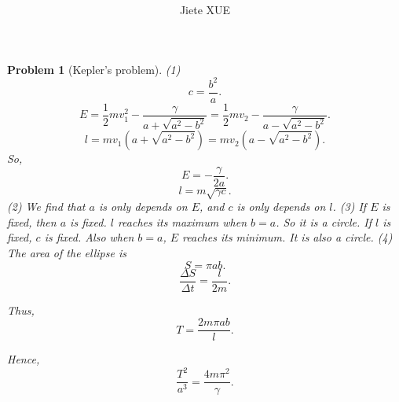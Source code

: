 \documentclass{article}
\title{\textbf{\mytitle}}
\author{Jiete XUE}
\date{\mydate}
\theoremstyle{1}
\newtheorem{problem}{Problem}
\begin{document}
\maketitle
\begin{problem}[Kepler’s problem]
    (1) 
    \begin{equation}
        c=\frac{b^2}{a}.
    \end{equation}
    \begin{equation}
    E=\frac{1}{2}mv_1^2-\frac{\gamma}{a+\sqrt{a^2-b^2}}=\frac{1}{2} mv_2-\frac{\gamma}{a-\sqrt{a^2-b^2}}.   
    \end{equation}
    \begin{equation}
        l=mv_1\left(a+\sqrt{a^2-b^2}\right)=mv_2\left(a-\sqrt{a^2-b^2}\right).
    \end{equation}
    So, 
    \begin{equation}
        E=-\frac{\gamma}{2a}.
    \end{equation}
    \begin{equation}
        l=m\sqrt{\gamma c}.
    \end{equation}
    (2) We find that $a$ is only depends on $E$, and $c$ is only depends on $l$.
    \newline
    (3) If $E$ is fixed, then $a$ is fixed. $l$ reaches its maximum when $b=a$. So it is a circle. If $l$ is fixed, $c$ is fixed. Also when $b=a$, $E$ reaches its minimum. It is also a circle.
    \newline
    (4) The area of the ellipse is
    \begin{equation}
    S=\pi a b.    
    \end{equation}
    \begin{equation}
        \frac{\Delta S}{\Delta t}=\frac{l}{2m}.
    \end{equation}
    
    Thus,
    \begin{equation}
        T=\frac{2m \pi a b }{l}.
    \end{equation}
    
    Hence, 
    \begin{equation}
        \frac{T^2}{a^3}=\frac{4m\pi^2}{\gamma}.
    \end{equation}
\end{problem}
\end{document}
